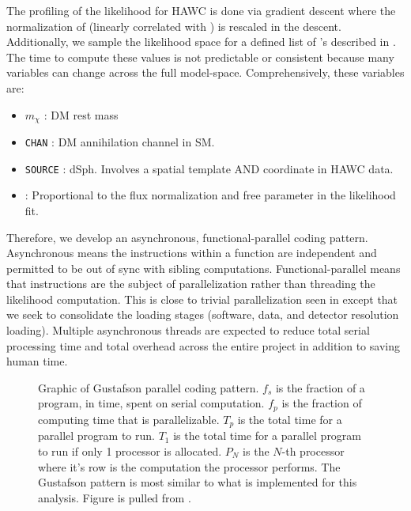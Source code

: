 The profiling of the likelihood for HAWC is done via gradient descent where the normalization of  (linearly correlated with \sv) is rescaled in the descent.
Additionally, we sample the likelihood space for a defined list of \sv's described in .
The time to compute these values is not predictable or consistent because many variables can change across the full model-space.
Comprehensively, these variables are:
\begin{itemize}
    \item $m_\chi$ : DM rest mass
    \item \texttt{CHAN} : DM annihilation channel in SM.
    \item \texttt{SOURCE} : dSph. Involves a spatial template AND coordinate in HAWC data.
    \item \sv: Proportional to the flux normalization and free parameter in the likelihood fit.
\end{itemize}
Therefore, we develop an asynchronous, functional-parallel coding pattern.
Asynchronous means the instructions within a function are independent and permitted to be out of sync with sibling computations.
Functional-parallel means that instructions are the subject of parallelization rather than threading the likelihood computation.
This is close to trivial parallelization seen in  except that we seek to consolidate the loading stages (software, data, and detector resolution loading).
Multiple asynchronous threads are expected to reduce total serial processing time and total overhead across the entire project in addition to saving human time.

\begin{figure}[h]
    \caption{Graphic of Gustafson parallel coding pattern. $f_s$ is the fraction of a program, in time, spent on serial computation. $f_p$ is the fraction of computing time that is parallelizable. $T_p$ is the total time for a parallel program to run. $T_1$ is the total time for a parallel program to run if only 1 processor is allocated. $P_N$ is the $N$-th processor where it's row is the computation the processor performs. The Gustafson pattern is most similar to what is implemented for this analysis. Figure is pulled from \cite{ArtofHPC}.}
    \label{fig:mtd_gufsta}
\end{figure}

